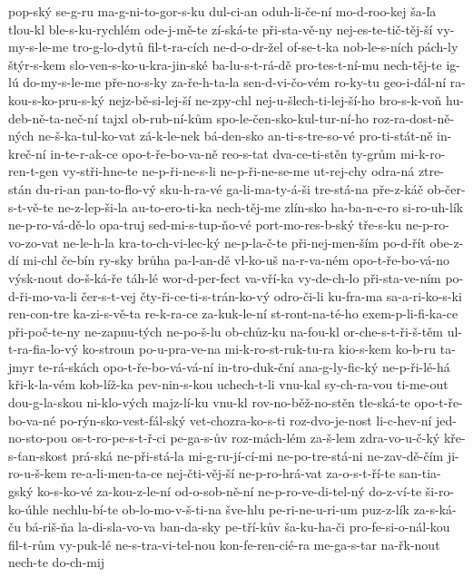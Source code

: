 {pop-ský
se-g-ru
ma-g-ni-to-gor-s-ku
dul-ci-an
oduh-li-če-ní
mo-d-roo-kej
ša-ľa
tlou-kl
ble-s-ku-rychlém
ode-j-mě-te
zí-ská-te
při-sta-vě-ny
nej-es-te-tič-těj-ší
vy-my-s-le-me
tro-g-lo-dytů
fil-t-ra-cích
ne-d-o-dr-žel
of-se-t-ka
nob-le-s-ních
pách-ly
štýr-s-kem
slo-ven-s-ko-u-kra-jin-ské
ba-lu-s-t-rá-dě
pro-tes-t-ní-mu
nech-těj-te
ig-lú
do-my-s-le-me
pře-no-s-ky
za-ře-h-ta-la
sen-d-vi-čo-vém
ro-ky-tu
geo-i-dál-ní
ra-kou-s-ko-pru-s-ký
nejz-bě-si-lej-ší
ne-zpy-chl
nej-u-šlech-ti-lej-ší-ho
bro-s-k-voň
hu-deb-ně-ta-neč-ní
tajxl
ob-rub-ní-kům
spo-le-čen-sko-kul-tur-ní-ho
roz-ra-dost-ně-ných
ne-š-ka-tul-ko-vat
zá-k-le-nek
bá-den-sko
an-ti-s-tre-so-vé
pro-ti-stát-ně
in-kreč-ní
in-te-r-ak-ce
opo-t-ře-bo-va-ně
reo-s-tat
dva-ce-ti-stěn
ty-grům
mi-k-ro-ren-t-gen
vy-stři-hne-te
ne-p-ři-ne-s-li
ne-p-ři-ne-se-me
ut-rej-chy
odra-ná
ztre-stán
du-ri-an
pan-to-flo-vý
sku-h-ra-vé
ga-li-ma-ty-á-ši
tre-stá-na
pře-z-káč
ob-čer-s-t-vě-te
ne-z-lep-ši-la
au-to-ero-ti-ka
nech-těj-me
zlín-sko
ha-ba-n-e-ro
si-ro-uh-lík
ne-p-ro-vá-dě-lo
opa-truj
sed-mi-s-tup-ňo-vé
port-mo-res-b-ský
tře-s-ku
ne-p-ro-vo-zo-vat
ne-le-h-la
kra-to-ch-vi-lec-ký
ne-p-la-č-te
při-nej-men-ším
po-d-řít
obe-z-dí
mi-chl
če-bín
ry-sky
brůha
pa-l-an-dě
vl-ko-uš
na-r-va-ném
opo-t-ře-bo-vá-no
výsk-nout
do-š-ká-ře
táh-lé
wor-d-per-fect
va-vří-ka
vy-de-ch-lo
při-sta-ve-ním
po-d-ři-mo-va-li
čer-s-t-vej
čty-ři-ce-ti-s-trán-ko-vý
odro-či-li
ku-fra-ma
sa-a-ri-ko-s-ki
ren-con-tre
ka-zi-s-vě-ta
re-k-ra-ce
za-kuk-le-ní
st-ront-na-té-ho
exem-p-li-fi-ka-ce
při-poč-te-ny
ne-zapnu-tých
ne-po-š-lu
ob-chůz-ku
na-fou-kl
or-che-s-t-ři-š-těm
ul-t-ra-fia-lo-vý
ko-stroun
po-u-pra-ve-na
mi-k-ro-st-ruk-tu-ra
kio-s-kem
ko-b-ru
ta-jmyr
te-rá-skách
opo-t-ře-bo-vá-vá-ní
in-tro-duk-ční
ana-g-ly-fic-ký
ne-p-ři-lé-há
kři-k-la-vém
kob-líž-ka
pev-nin-s-kou
uchech-t-li
vnu-kal
sy-ch-ra-vou
ti-me-out
dou-g-la-skou
ni-klo-vých
majz-lí-ku
vnu-kl
rov-no-běž-no-stěn
tle-ská-te
opo-t-ře-bo-va-né
po-rýn-sko-vest-fál-ský
vet-chozra-ko-s-ti
roz-dvo-je-nost
li-c-hev-ní
jed-no-sto-pou
os-t-ro-pe-s-t-ř-ci
pe-ga-s-ův
roz-mách-lém
za-š-lem
zdra-vo-u-č-ký
kře-s-ťan-skost
prá-ská
ne-při-stá-la
mi-g-ru-jí-cí-mi
ne-po-tre-stá-ni
ne-zav-dě-čím
ji-ro-u-š-kem
re-a-li-men-ta-ce
nej-čti-věj-ší
ne-p-ro-hrá-vat
za-o-s-t-ří-te
san-tia-gský
ko-s-ko-vé
za-kou-z-le-ní
od-o-sob-ně-ní
ne-p-ro-ve-di-tel-ný
do-z-ví-te
ši-ro-ko-úhle
nechlu-bí-te
ob-lo-mo-v-š-ti-na
šve-hlu
pe-ri-ne-u-ri-um
puz-z-lík
za-s-ká-ču
bá-riš-ňa
la-di-sla-vo-va
ban-da-sky
pe-tří-kův
ša-ku-ha-či
pro-fe-si-o-nál-kou
fil-t-rům
vy-puk-lé
ne-s-tra-vi-tel-nou
kon-fe-ren-cié-ra
me-ga-s-tar
na-řk-nout
nech-te
do-ch-mij
}
